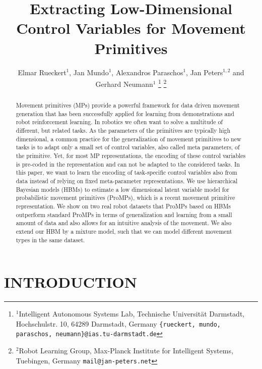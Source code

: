 \documentclass[letterpaper, 10 pt, conference]{ieeeconf}  %
\title{\LARGE \bf
Extracting Low-Dimensional Control Variables for Movement Primitives
}
\author{Elmar Rueckert$^{1}$, Jan Mundo$^{1}$, Alexandros Paraschos$^{1}$, Jan Peters$^{1,2}$ and Gerhard Neumann$^{1}$%
 \thanks{$^{1}$Intelligent Autonomous Systems Lab, 
	Technische Universit\"at Darmstadt,
        Hochschulstr. 10, 64289 Darmstadt, Germany
         {\tt\small \{rueckert, mundo, paraschos, neumann\}@ias.tu-darmstadt.de}}%
\thanks{$^{2}$Robot Learning Group, Max-Planck Institute for Intelligent Systems,
	Tuebingen, Germany
        {\tt\small mail@jan-peters.net}}
}
\begin{document}
\maketitle
\thispagestyle{empty}
\pagestyle{empty}


\begin{abstract}
Movement primitives (MPs) provide a powerful framework for data driven movement generation that
has been successfully applied for learning from demonstrations and robot reinforcement learning. 
In robotics we often want to solve a multitude of different, but related tasks. As the parameters of the primitives are typically high 
dimensional, a common practice for the generalization of movement primitives to new tasks is to 
adapt only a small set of control variables, also called meta parameters, of the primitive. Yet, for most MP representations, the encoding
of these control variables is pre-coded in the representation and can not be adapted to the considered tasks. 
In this paper, we want to learn the encoding of task-specific control variables also from data instead of relying on fixed meta-parameter representations. 
We use hierarchical Bayesian models (HBMs) to estimate a low dimensional latent variable model 
for probabilistic movement primitives (ProMPs), which is a recent movement primitive representation. We show on two real robot 
datasets that ProMPs based on HBMs outperform standard ProMPs in terms of generalization and learning from a small amount of data 
and also allows for an intuitive analysis of the movement. We also extend our HBM by a mixture model, such that we can model 
different movement types in the same dataset. 
\end{abstract}


\section{INTRODUCTION}
\end{document}
